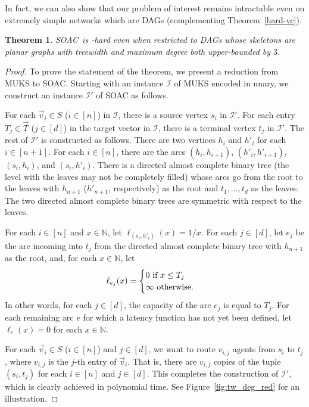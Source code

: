 \documentclass[letterpaper]{article} %
\newtheorem{theorem}{Theorem}
\newcommand{\problem}{{\sc SOAC}\xspace} %
\begin{document}
In fact, we can also show that our problem of interest remains intractable even on extremely simple networks which are DAGs (complementing Theorem~\ref{hard-vc}).

\begin{theorem}
\label{hard-tw-delta}
\problem\ is \NP-hard even when restricted to DAGs whose skeletons are planar graphs with treewidth and maximum degree both upper-bounded by $3$.
\end{theorem}

\begin{proof}
To prove the statement of the theorem, we present a reduction from \textsc{MUKS} to \problem.
Starting with an instance $\mathcal{I}$ of \textsc{MUKS} encoded in unary, we construct an instance $\mathcal{I}'$ of \problem{} as follows.

For each $\vec v_i \in S$ ($i\in [n]$) in $\mathcal{I}$, there is a source vertex $s_i$ in $\mathcal{I}'$.
For each entry $T_j\in \vec T$ ($j\in [d]$) in the target vector in $\mathcal{I}$, there is a terminal vertex $t_j$ in $\mathcal{I}'$.
The rest of $\mathcal{I}'$ is constructed as follows.
There are two vertices $h_i$ and $h'_i$ for each $i\in [n+1]$.
For each $i\in [n]$, there are the arcs $(h_i,h_{i+1})$, $(h'_i,h'_{i+1})$, $(s_i,h_i)$, and $(s_i,h'_i)$.
There is a directed almost complete binary tree (the level with the leaves may not be completely filled) whose arcs go from the root to the leaves with $h_{n+1}$ ($h'_{n+1}$, respectively) as the root and $t_1,\ldots,t_d$ as the leaves.
The two directed almost complete binary trees are symmetric with respect to the leaves.

For each $i\in [n]$ and $x\in \mathbb{N}$, let $\ell_{(s_i,h'_i)}(x) = 1/x$.
For each $j\in [d]$, let $e_j$ be the arc incoming into $t_j$ from the directed almost complete binary tree with $h_{n+1}$ as the root, and, for each $x\in \mathbb{N}$, let
\[
\ell_{e_j}(x) =
\begin{cases}
0 $ if $ x \leq T_j \\
\infty $ otherwise$.
\end{cases}
\]
In other words, for each $j\in [d]$, the capacity of the arc $e_j$ is equal to $T_j$.
For each remaining arc $e$ for which a latency function has not yet been defined, let $\ell_{e}(x) = 0$ for each $x\in \mathbb{N}$.

For each $\vec v_i \in S$ ($i\in [n]$) and $j\in [d]$, we want to route $v_{i,j}$ agents from $s_i$ to $t_j$, where $v_{i,j}$ is the $j$-th entry of $\vec v_i$.
That is, there are $v_{i,j}$ copies of the tuple $(s_i, t_j)$ for each $i\in [n]$ and $j\in [d]$.
This completes the construction of $\mathcal{I}'$, which is clearly achieved in polynomial time.
See Figure~\ref{fig:tw_deg_red} for an illustration.


\end{proof}
\end{document}
